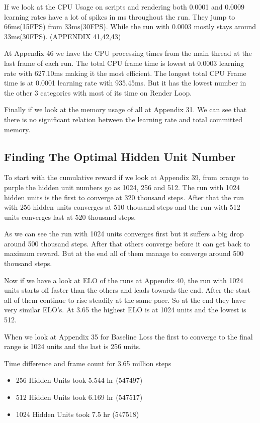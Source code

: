 \documentclass{LSkill}
\begin{document}
If we look at the CPU Usage on scripts and rendering both 0.0001 and 0.0009 learning rates have a lot of spikes in ms throughout the run. They jump to 66ms(15FPS) from 33ms(30FPS). While the run with 0.0003 mostly stays around 33ms(30FPS).
(APPENDIX 41,42,43)

At Appendix 46 we have the CPU processing times from the main thread at the last frame of each run. The total CPU frame time is lowest at 0.0003 learning rate with 627.10ms making it the most efficient. The longest total CPU Frame time is at 0.0001 learning rate with 935.45ms. But it has the lowest number in the other 3 categories with most of its time on Render Loop.


Finally if we look at the memory usage of all at Appendix 31. We can see that there is no significant relation between the learning rate and total committed memory.

\subsection{Finding The Optimal Hidden Unit Number}

To start with the cumulative reward if we look at Appendix 39, from orange to purple the hidden unit numbers go as 1024, 256 and 512. The run with 1024 hidden units is the first to converge at 320 thousand steps. After that the run with 256 hidden units converges at 510 thousand steps and the run with 512 units converges last at 520 thousand steps.

As we can see the run with 1024 units converges first but it suffers a big drop around 500 thousand steps. After that others converge before it can get back to maximum reward. But at the end all of them manage to converge around 500 thousand steps.


Now if we have a look at ELO of the runs at Appendix 40, the run with 1024 units starts off faster than the others and leads towards the end. After the start all of them continue to rise steadily at the same pace. So at the end they have very similar ELO’s. At 3.65 the highest ELO is at 1024 units and the lowest is 512.

When we look at Appendix 35 for Baseline Loss the first to converge to the final range is 1024 units and the last is 256 units.

Time difference and frame count for 3.65 million steps
\begin{itemize}
    \item 256 Hidden Units took 5.544 hr (547497)		
    \item 512 Hidden Units took 6.169 hr (547517)
    \item 1024 Hidden Units took  7.5 hr (547518)
\end{itemize}
\end{document}
